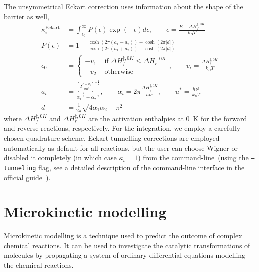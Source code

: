 The unsymmetrical Eckart correction uses information about the shape of the barrier as well,
% 
\begin{equation}
	\begin{split}
		\kappa_i^\text{Eckart}
		&= \int_{\epsilon_0}^\infty
		P(\epsilon) \exp \left(
		-\epsilon
		\right) d \epsilon,
		\qquad
		\epsilon
		= \frac{E - \Delta H^{\ddagger,
					0 K}_f}{k_B T} \\
		P(\epsilon)
		&= 1
		- \frac{
			\cosh \left(
			2 \pi (a_1 - a_2)
			\right)
			+ \cosh \left(
			2 \pi |d|
			\right)
		}{
			\cosh \left(
			2 \pi (a_1 + a_2)
			\right)
			+ \cosh \left(
			2 \pi |d|
			\right)
		} \\
		\epsilon_0 &= \begin{cases}
			-v_1 & \text{ if }
			\Delta H^{\ddagger,
					0 K}_f \le \Delta H^{\ddagger,
			0 K}_r                   \\
			-v_2 & \text{ otherwise}
		\end{cases},
		\qquad
		v_i
		= \frac{\Delta H^{\ddagger,
					0 K}_i}{k_B T} \\
		a_i
		&= \frac{
			\left[
				2
				\frac{
					\epsilon + v_i
				}{\pi u^*}
				\right]^{-\frac{1}{2}}
		}{
			\alpha_1^{-\frac{1}{2}}
			+ \alpha_2^{-\frac{1}{2}}
		},
		\qquad
		\alpha_i
		= 2 \pi \frac{
			\Delta H^{\ddagger,
					0 K}_i
		}{
			h \nu^\ddagger
		},
		\qquad
		u^*
		= \frac{
			h \nu^\ddagger
		}{
			k_B T
		} \\
		d
		&= \frac{1}{2 \pi}
		\sqrt{
			4 \alpha_1 \alpha_2 - \pi^2
		}
	\end{split}
\end{equation}
% 
where $\Delta H^{\ddagger,
			0 K}_f$ and $\Delta H^{\ddagger,
			0 K}_r$ are the activation enthalpies at 0~K for the forward and reverse reactions,
respectively.
For the integration,
we employ a carefully chosen quadrature scheme.
Eckart tunnelling corrections are employed automatically as default for all reactions,
but the user can choose Wigner or disabled it completely (in which case $\kappa_i = 1$)
from the command-line~(using the \texttt{--tunneling} flag,
see a detailed description of the command-line interface in the official guide~\cite{overreactguidecli2022}).

\section{Microkinetic modelling}

Microkinetic modelling is a technique used to predict the outcome of complex
chemical reactions.
It can be used to investigate the catalytic transformations of molecules by
propagating a system of ordinary differential equations modelling the chemical
reactions.

